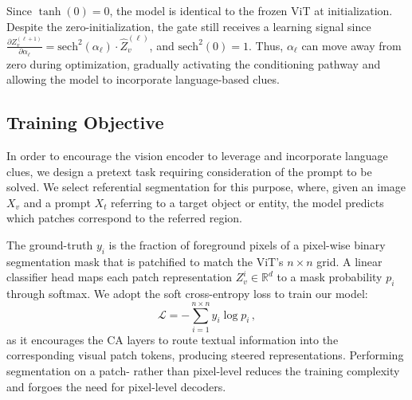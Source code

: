 Since $\tanh(0) = 0$, the model is identical to the frozen ViT at initialization.
Despite the zero-initialization, the gate still receives a learning signal since
$\frac{\partial Z_v^{(\ell+1)}}{\partial \alpha_\ell}
=
\mathrm{sech}^2(\alpha_\ell) \cdot \hat{Z}_v^{(\ell)}$,
and $\mathrm{sech}^2(0)=1$. %
Thus, $\alpha_\ell$ can move away from zero during optimization, gradually activating the conditioning pathway and allowing the model to incorporate language-based clues.

\subsection{Training Objective}
\label{sec:objective}
In order to encourage the vision encoder to leverage and incorporate language clues, we design a pretext task requiring consideration of the prompt to be solved. We select referential segmentation for this purpose, where, given an image $X_v$ and a prompt $X_t$ referring to a target object or entity, the model predicts which patches correspond to the referred region.


The ground-truth $y_i$ is the fraction of foreground pixels of a pixel-wise binary segmentation mask that is patchified to match the ViT's $n \times n$ grid.
A linear classifier head maps each patch representation $Z_v^i \in \mathbb{R}^{d}$ to a mask probability $p_i$ through softmax.
We adopt the soft cross-entropy loss to train our model:
\begin{equation}
\textstyle
\mathcal{L} = - \sum_{i=1}^{n \times n} y_i \log p_i \, ,
\label{eq:loss}
\end{equation}
as it encourages the CA layers to route
textual information into the corresponding visual patch tokens, producing steered representations.
Performing segmentation on a patch- rather than pixel-level reduces the training complexity and forgoes the need for pixel-level decoders. 


